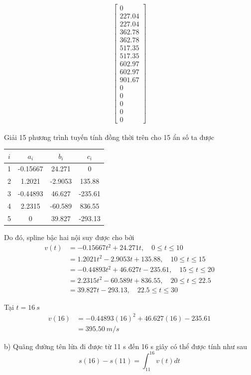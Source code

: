 \begin{align*}
\begin{bmatrix}
0 \\ 227.04 \\ 227.04 \\ 362.78 \\ 362.78 \\ 517.35 \\ 517.35 \\ 602.97 \\ 602.97 \\ 901.67 \\ 0 \\ 0 \\ 0 \\ 0 \\ 0
\end{bmatrix}
\end{align*}

Giải 15 phương trình tuyến tính đồng thời trên cho 15 ẩn số ta được
\begin{table}[h]
\centering
\begin{tabular}{|c|c|c|c|}
\hline
$i$ & $a_i$ & $b_i$ & $c_i$ \\
\hline
1 & -0.15667 & 24.271 & 0 \\
2 & 1.2021 & -2.9053 & 135.88 \\
3 & -0.44893 & 46.627 & -235.61 \\
4 & 2.2315 & -60.589 & 836.55 \\
5 & 0 & 39.827 & -293.13 \\
\hline
\end{tabular}
\end{table}

Do đó, spline bậc hai nội suy được cho bởi
\begin{align}
v(t) &= -0.15667t^2 + 24.271t, \quad 0 \le t \le 10 \nonumber \\
&= 1.2021t^2 - 2.9053t + 135.88, \quad 10 \le t \le 15 \nonumber \\
&= -0.44893t^2 + 46.627t - 235.61, \quad 15 \le t \le 20 \\
&= 2.2315t^2 - 60.589t + 836.55, \quad 20 \le t \le 22.5 \nonumber \\
&= 39.827t - 293.13, \quad 22.5 \le t \le 30 \nonumber
\end{align}

Tại $t=16~s$
\begin{align}
v(16) &= -0.44893(16)^2 + 46.627(16) - 235.61 \nonumber \\
&= 395.50~m/s
\end{align}

b) Quãng đường tên lửa đi được từ 11 s đến 16 s giây có thể được tính như sau
\begin{equation}
s(16)-s(11)=\int_{11}^{16}v(t)dt
\end{equation}

